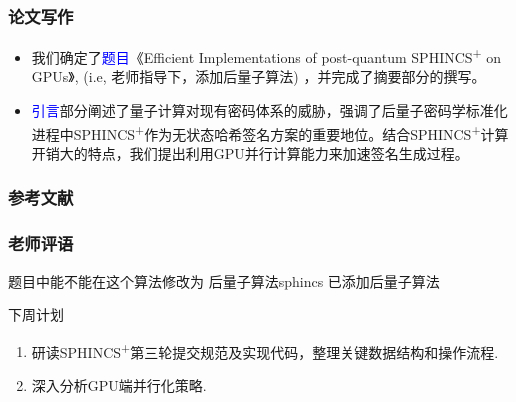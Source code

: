 \documentclass{beamer}
\begin{document}
\begin{frame}
  \frametitle{论文写作}
  \begin{itemize}
    \item 我们确定了\textcolor{blue}{题目}《Efficient Implementations of post-quantum SPHINCS\textsuperscript{+} on GPUs》, (i.e, 老师指导下，添加后量子算法) ，并完成了摘要部分的撰写。
    \item \textcolor{blue}{引言}部分阐述了量子计算对现有密码体系的威胁，强调了后量子密码学标准化进程中SPHINCS\textsuperscript{+}作为无状态哈希签名方案的重要地位。结合SPHINCS\textsuperscript{+}计算开销大的特点，我们提出利用GPU并行计算能力来加速签名生成过程。
  \end{itemize}
\end{frame}

\begin{frame}[allowframebreaks]
  \frametitle{参考文献}
  
\end{frame}
\begin{frame}
  \frametitle{老师评语}
  \begin{alertblock}{题目中能不能在这个算法修改为 后量子算法sphincs}
    已添加后量子算法
  \end{alertblock}
  \begin{block}{下周计划}
    \begin{enumerate}
      \item 研读SPHINCS\textsuperscript{+}第三轮提交规范及实现代码，整理关键数据结构和操作流程.
      \item 深入分析GPU端并行化策略\cite{Wang2025}.
    \end{enumerate}
  \end{block}

\end{frame}
\end{document}
